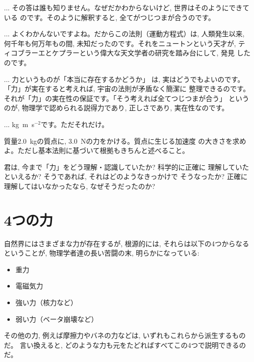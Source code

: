 \begin{faq}{\small{}
... その答は誰も知りません。なぜだかわからないけど, 世界はそのようにできている
のです。そのように解釈すると, 全てがつじつまが合うのです。}\end{faq}

\begin{faq}{\small{}
... よくわかんないですよね。だからこの法則（運動方程式）は, 人類発生以来, 
何千年も何万年もの間, 未知だったのです。それをニュートンという天才が, 
ティコブラーエとケプラーという偉大な天文学者の研究を踏み台にして, 発見
したのです。}\end{faq}

\begin{faq} {\small{} ... 力というものが「本当に存在するかどうか」
は, 実はどうでもよいのです。「力」が実在すると考えれば, 宇宙の法則が矛盾なく簡潔に
整理できるのです。それが「力」の実在性の保証です。「そう考えれば全てつじつまが合う」
というのが, 物理学で認められる説得力であり, 正しさであり, 実在性なのです。
}\end{faq}

\begin{faq}{\small{}
... kg~m~s$^{-2}$です。ただそれだけ。}\end{faq}
\mv

\begin{q}\label{q:2kg3Nacc} 質量2.0~kgの質点に, 3.0~Nの力をかける。質点に生じる加速度
の大きさを求めよ。ただし基本法則に基づいて根拠もきちんと述べること。\end{q}

\begin{q}\label{q:4forece}
君は, 今まで「力」をどう理解・認識していたか? 科学的に正確に
理解していたといえるか? そうであれば, それはどのようなきっかけで
そうなったか? 正確に理解してはいなかったなら, なぜそうだったのか?
\end{q}


\section{4つの力}

自然界にはさまざまな力が存在するが, 根源的には, それらは以下の4つからなる
ということが, 物理学者達の長い苦闘の末, 明らかになっている:
\begin{itemize}
\item 重力
\item 電磁気力
\item 強い力（核力など）
\item 弱い力（ベータ崩壊など）
\end{itemize}
その他の力, 例えば摩擦力やバネの力などは, いずれもこれらから派生するものだ。
言い換えると, どのような力も元をたどればすべてこの4つで説明できるのだ。

